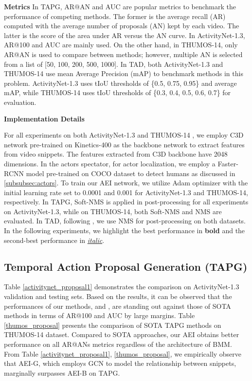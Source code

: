 \documentclass{bmvc2k}
\begin{document}
\noindent
\textbf{Metrics}
\newline 
In TAPG, AR@AN and AUC are popular metrics to benchmark the performance of competing methods. The former is the average recall (AR) computed with the average number of proposals (AN) kept by each video. The latter is the score of the area under AR versus the AN curve. In ActivityNet-1.3, AR@100 and AUC are mainly used. On the other hand, in THUMOS-14, only AR@AN is used to compare between methods; however, multiple AN is selected from a list of [50, 100, 200, 500, 1000].
\newline\indent
In TAD, both ActivityNet-1.3 and THUMOS-14 use mean Average Precision (mAP) to benchmark methods in this problem. ActivityNet-1.3 uses tIoU thresholds of \{0.5, 0.75, 0.95\} and average mAP, while THUMOS-14 uses tIoU thresholds of \{0.3, 0.4, 0.5, 0.6, 0.7\} for evaluation.

\noindent
\textbf{Implementation Details}

\noindent
For all experiments on both ActivityNet-1.3 \cite{caba2015activitynet} and THUMOS-14 \cite{THUMOS14}, we employ C3D \cite{C3D} network pre-trained on Kinetics-400 \cite{Kinetics} as the backbone network to extract features from video snippets. The features extracted from C3D backbone have 2048 dimensions.
\newline \indent
In the actors spectator, for actor localization, we employ a Faster-RCNN model \cite{FasterRCNN} pre-trained on COCO \cite{cocodataset} dataset to detect humans as discussed in \ref{subsubsec:actors}. To train our AEI network, we utilize Adam optimizer with the initial learning rate set to 0.0001 and 0.001 for ActivityNet-1.3 and THUMOS-14, respectively. 
\newline \indent
In TAPG, Soft-NMS \cite{SoftNMS} is applied in post-processing for all experiments on ActivityNet-1.3, while on THUMOS-14, both Soft-NMS \cite{SoftNMS} and NMS \cite{NMS} are evaluated. In TAD, following \cite{lin2018bsn, bmn}, we use NMS \cite{NMS} for post-processing on both datasets.
\newline \indent
In the following experiments, we highlight the best performance in \textbf{bold} and the second-best performance in \underline{\textit{italic}}.

\subsection{Temporal Action Proposal Generation (TAPG)}

Table \ref{activitynet_proposal1} demonstrates the comparison on ActivityNet-1.3 validation and testing sets. Based on the results, it can be observed that the performances of our methods,  and , are standing out against those of SOTA methods in terms of AR@100 and AUC by large margins. Table \ref{thumos_proposal} presents the comparison of SOTA TAPG methods on THUMOS-14 dataset. Compared to SOTA approaches, our AEI obtains better performance on all AR@ANs metrics regardless of the architecture of BMM. From Table \ref{activitynet_proposal1}, \ref{thumos_proposal}, we empirically observe that AEI-G, which employs GCN to model the relationship between snippets, marginally surpasses  AEI-B on TAPG.
\end{document}
